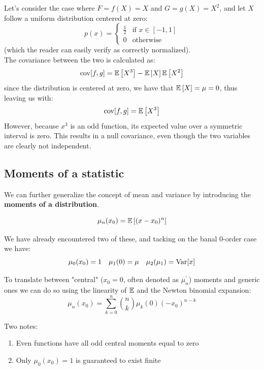 \begin{example}
Let's consider the case where $F=f(X)=X$ and $G=g(X)=X^2$, and let $X$ follow a uniform distribution centered at zero:
	\[
	p(x) = \begin{cases} \frac{1}{2} & \text{if } x \in [-1,1] \\ 0 &  \text{otherwise} \end{cases}
	\]
(which the reader can easily verify as correctly normalized).\\
The covariance between the two is calculated as:
	\[
	\operatorname{cov}[f,g]=\mathbb{E}\left[X^3\right]-\mathbb{E}\left[X\right]\mathbb{E}\left[X^2\right]
	\]
since the distribution is centered at zero, we have that $\mathbb{E}\left[X\right]=\mu=0$, thus leaving us with:
	\[
	\operatorname{cov}[f,g]=\mathbb{E}\left[X^3\right]
	\]
However, because $x^3$ is an odd function, its expected value over a symmetric interval is zero. This results in a null covariance, even though the two variables are clearly not independent.
\end{example}

\subsection{Moments of a statistic}
\label{subsec:moments}
We can further generalize the concept of mean and variance by introducing the \textbf{moments of a distribution}.
\begin{definition}
	\[
	\mu_n(x_0) = \mathbb{E}\left[ (x-x_0)^n\right]
	\]
\end{definition}

We have already encountered two of these, and tacking on the banal $0$-order case we have:
	\[
	\mu_0(x_0) = 1 \quad \mu_1(0) = \mu \quad \mu_2(\mu_1) = \operatorname{Var}[x]
	\]

To translate between "central" ($x_0=0$, often denoted as $\mu_n^\prime$) moments and generic ones we can do so using the linearity of $\mathbb{E}$ and the Newton binomial expansion: 
	\[
	\mu_n(x_0) = \sum_{k=0}^n \binom{n}{k} \mu_k(0)(-x_0)^{n-k}
	\]

Two notes: 
\begin{enumerate}
	\item Even functions have all odd central moments equal to zero
	\item Only $\mu_0(x_0) = 1$ is guaranteed to exist finite
\end{enumerate}

